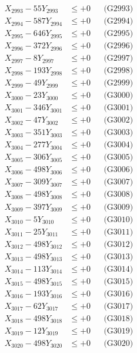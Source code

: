 \documentclass[a4paper,10pt]{article}
\begin{document}
{\begin{align}
X_{2993} - 55Y_{2993} &\leq +0 && \text{(G2993)} \\
X_{2994} - 587Y_{2994} &\leq +0 && \text{(G2994)} \\
X_{2995} - 646Y_{2995} &\leq +0 && \text{(G2995)} \\
X_{2996} - 372Y_{2996} &\leq +0 && \text{(G2996)} \\
X_{2997} - 8Y_{2997} &\leq +0 && \text{(G2997)} \\
X_{2998} - 193Y_{2998} &\leq +0 && \text{(G2998)} \\
X_{2999} - 49Y_{2999} &\leq +0 && \text{(G2999)} \\
X_{3000} - 23Y_{3000} &\leq +0 && \text{(G3000)} \\
\allowbreak
X_{3001} - 346Y_{3001} &\leq +0 && \text{(G3001)} \\
X_{3002} - 47Y_{3002} &\leq +0 && \text{(G3002)} \\
X_{3003} - 351Y_{3003} &\leq +0 && \text{(G3003)} \\
X_{3004} - 277Y_{3004} &\leq +0 && \text{(G3004)} \\
X_{3005} - 306Y_{3005} &\leq +0 && \text{(G3005)} \\
X_{3006} - 498Y_{3006} &\leq +0 && \text{(G3006)} \\
X_{3007} - 309Y_{3007} &\leq +0 && \text{(G3007)} \\
X_{3008} - 498Y_{3008} &\leq +0 && \text{(G3008)} \\
X_{3009} - 397Y_{3009} &\leq +0 && \text{(G3009)} \\
X_{3010} - 5Y_{3010} &\leq +0 && \text{(G3010)} \\
\allowbreak
X_{3011} - 25Y_{3011} &\leq +0 && \text{(G3011)} \\
X_{3012} - 498Y_{3012} &\leq +0 && \text{(G3012)} \\
X_{3013} - 498Y_{3013} &\leq +0 && \text{(G3013)} \\
X_{3014} - 113Y_{3014} &\leq +0 && \text{(G3014)} \\
X_{3015} - 498Y_{3015} &\leq +0 && \text{(G3015)} \\
X_{3016} - 193Y_{3016} &\leq +0 && \text{(G3016)} \\
X_{3017} - 62Y_{3017} &\leq +0 && \text{(G3017)} \\
X_{3018} - 498Y_{3018} &\leq +0 && \text{(G3018)} \\
X_{3019} - 12Y_{3019} &\leq +0 && \text{(G3019)} \\
X_{3020} - 498Y_{3020} &\leq +0 && \text{(G3020)} \\

\end{align}}
\end{document}
